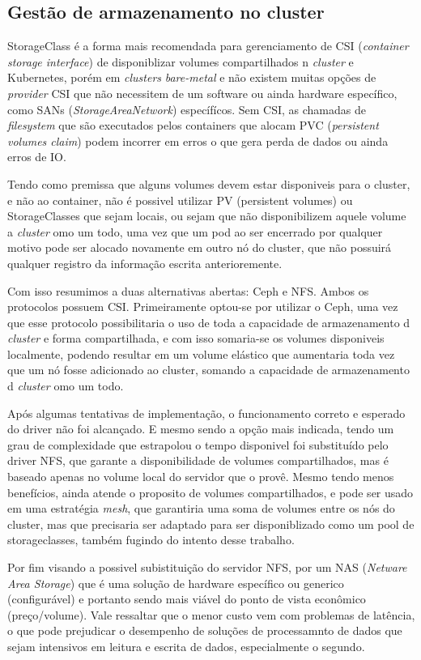 \subsection{Gestão de armazenamento no cluster}
StorageClass é a forma mais recomendada para gerenciamento de CSI (\emph{container storage interface}) de disponiblizar volumes compartilhados n \emph{cluster} e Kubernetes\textregistered, porém em \emph{clusters }\emph{bare-metal} e não existem muitas opções de \emph{provider} CSI que não necessitem de um software ou ainda hardware específico, como SANs (\emph{StorageAreaNetwork}) específícos. Sem CSI, as chamadas de \emph{filesystem} que são executados pelos containers que alocam PVC (\emph{persistent volumes claim}) podem incorrer em erros o que gera perda de dados ou ainda erros de IO. 


Tendo como premissa que alguns volumes devem estar disponiveis para o cluster, e não ao container, não é possivel utilizar PV (persistent volumes) ou StorageClasses que sejam locais, ou sejam que não disponibilizem aquele volume a \emph{cluster} omo um todo, uma vez que um pod ao ser encerrado por qualquer motivo pode ser alocado novamente em outro nó do cluster, que não possuirá qualquer registro da informação escrita anterioremente. 

Com isso resumimos a duas alternativas abertas: Ceph e NFS. Ambos os protocolos possuem CSI. Primeiramente optou-se por utilizar o Ceph, uma vez que esse protocolo possibilitaria o uso de toda a capacidade de armazenamento d \emph{cluster} e forma compartilhada, e com isso somaria-se os volumes disponiveis localmente, podendo resultar em um volume elástico que aumentaria toda vez que um nó fosse adicionado ao cluster, somando a capacidade de armazenamento d \emph{cluster} omo um todo. 

Após algumas tentativas de implementação, o funcionamento correto e esperado do driver não foi alcançado. E mesmo sendo a opção mais indicada, tendo um grau de complexidade que estrapolou o tempo disponivel foi substituído pelo driver NFS, que garante a disponibilidade de volumes compartilhados, mas é baseado apenas no volume local do servidor que o provê. Mesmo tendo menos benefícios, ainda atende o proposito de volumes compartilhados, e pode ser usado em uma estratégia \emph{mesh}, que garantiria uma soma de volumes entre os nós do cluster, mas que precisaria ser adaptado para ser disponiblizado como um pool de storageclasses, também fugindo do intento desse trabalho.

Por fim visando a possivel subistituição do servidor NFS, por um NAS (\emph{Netware Area Storage}) que é uma solução de hardware específico ou generico (configurável) e portanto sendo mais viável do ponto de vista econômico (preço/volume). Vale ressaltar que o menor custo vem com problemas de latência, o que pode prejudicar o desempenho de soluções de processamnto de dados que sejam intensivos em leitura e escrita de dados, especialmente o segundo.

